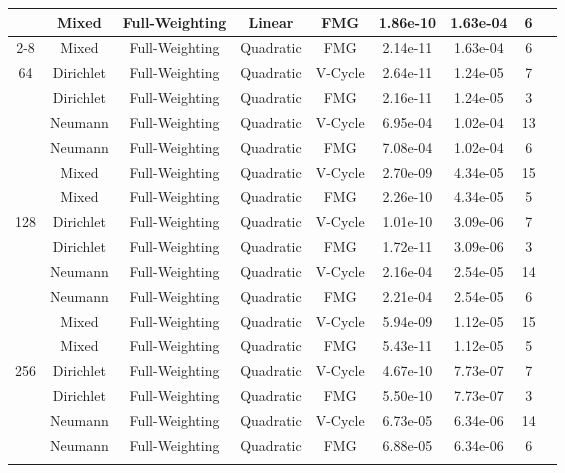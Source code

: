 \documentclass{ctexart}
\begin{document}
\begin{longtable}{ccccccccc}
\multirow{18}{*}{}		& Mixed		& Full-Weighting	& Linear	& FMG		& 1.86e-10	& 1.63e-04	& 6		\\ \cline{2-8}
\multirow{18}{*}{}		& Mixed		& Full-Weighting	& Quadratic	& FMG		& 2.14e-11	& 1.63e-04	& 6		\\ \hline
\multirow{6}{*}{64}		& Dirichlet	& Full-Weighting	& Quadratic	& V-Cycle	& 2.64e-11	& 1.24e-05	& 7		\\ \cline{2-8}
\multirow{6}{*}{}		& Dirichlet	& Full-Weighting	& Quadratic	& FMG		& 2.16e-11	& 1.24e-05	& 3		\\ \cline{2-8}
\multirow{6}{*}{}		& Neumann	& Full-Weighting	& Quadratic	& V-Cycle	& 6.95e-04	& 1.02e-04	& 13	\\ \cline{2-8}
\multirow{6}{*}{}		& Neumann	& Full-Weighting	& Quadratic	& FMG		& 7.08e-04	& 1.02e-04	& 6		\\ \cline{2-8}
\multirow{6}{*}{}		& Mixed		& Full-Weighting	& Quadratic	& V-Cycle	& 2.70e-09	& 4.34e-05	& 15	\\ \cline{2-8}
\multirow{6}{*}{}		& Mixed		& Full-Weighting	& Quadratic	& FMG		& 2.26e-10	& 4.34e-05	& 5		\\ \hline
\multirow{6}{*}{128}	& Dirichlet	& Full-Weighting	& Quadratic	& V-Cycle	& 1.01e-10	& 3.09e-06	& 7		\\ \cline{2-8}
\multirow{6}{*}{}		& Dirichlet	& Full-Weighting	& Quadratic	& FMG		& 1.72e-11	& 3.09e-06	& 3		\\ \cline{2-8}
\multirow{6}{*}{}		& Neumann	& Full-Weighting	& Quadratic	& V-Cycle	& 2.16e-04	& 2.54e-05	& 14	\\ \cline{2-8}
\multirow{6}{*}{}		& Neumann	& Full-Weighting	& Quadratic	& FMG		& 2.21e-04	& 2.54e-05	& 6		\\ \cline{2-8}
\multirow{6}{*}{}		& Mixed		& Full-Weighting	& Quadratic	& V-Cycle	& 5.94e-09	& 1.12e-05	& 15	\\ \cline{2-8}
\multirow{6}{*}{}		& Mixed		& Full-Weighting	& Quadratic	& FMG		& 5.43e-11	& 1.12e-05	& 5		\\ \hline
\multirow{6}{*}{256}	& Dirichlet	& Full-Weighting	& Quadratic	& V-Cycle	& 4.67e-10	& 7.73e-07	& 7		\\ \cline{2-8}
\multirow{6}{*}{}		& Dirichlet	& Full-Weighting	& Quadratic	& FMG		& 5.50e-10	& 7.73e-07	& 3		\\ \cline{2-8}
\multirow{6}{*}{}		& Neumann	& Full-Weighting	& Quadratic	& V-Cycle	& 6.73e-05	& 6.34e-06	& 14	\\ \cline{2-8}
\multirow{6}{*}{}		& Neumann	& Full-Weighting	& Quadratic	& FMG		& 6.88e-05	& 6.34e-06	& 6		\\ \cline{2-8}

\end{longtable}
\end{document}
